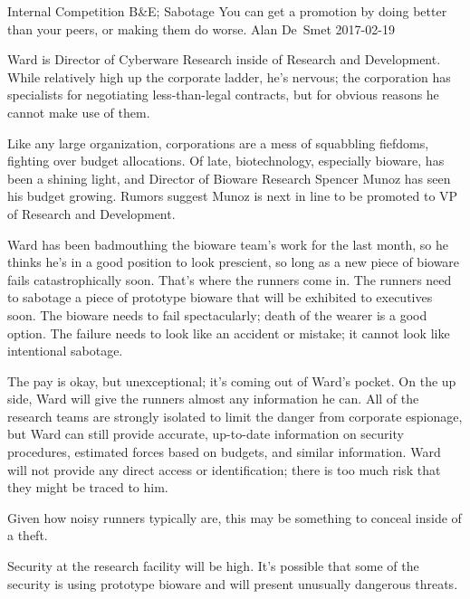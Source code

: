 \begin{scenario}[CC-BY-SA-4.0]
	{Internal Competition}
	{B\&E; Sabotage}
	{You can get a promotion by doing better than your peers, or making them do worse.}
	{Alan De~Smet}
	{2017-02-19}
	{}

 Ward is Director of Cyberware Research inside of Research and Development.  While relatively high up the corporate ladder, he's nervous; the corporation has specialists for negotiating less-than-legal contracts, but for obvious reasons he cannot make use of them.

\synopsis Like any large organization, corporations are a mess of squabbling fiefdoms, fighting over budget allocations.  Of late, biotechnology, especially bioware, has been a shining light, and Director of Bioware Research Spencer Munoz has seen his budget growing. Rumors suggest Munoz is next in line to be promoted to VP of Research and Development.

Ward has been badmouthing the bioware team's work for the last month, so he thinks he's in a good position to look prescient, so long as a new piece of bioware fails catastrophically soon.  That's where the runners come in.  The runners need to sabotage a piece of prototype bioware that will be exhibited to executives soon.  The bioware needs to fail spectacularly; death of the wearer is a good option.  The failure needs to look like an accident or mistake; it cannot look like intentional sabotage.

The pay is okay, but unexceptional; it's coming out of Ward's pocket.  On the up side, Ward will give the runners almost any information he can. All of the research teams are strongly isolated to limit the danger from corporate espionage, but Ward can still provide accurate, up-to-date information on security procedures, estimated forces based on budgets, and similar information.  Ward will not provide any direct access or identification; there is too much risk that they might be traced to him.

\notes Given how noisy runners typically are, this may be something to conceal inside of a theft.

Security at the research facility will be high.  It's possible that some of the security is using prototype bioware and will present unusually dangerous threats.  

\end{scenario}
